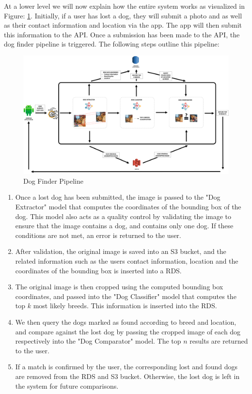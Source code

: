 \documentclass{article}
\begin{document}
At a lower level we will now explain how the entire system works as visualized in Figure: \ref{fig:x app pipeline}.  Initially, if a user has lost a dog, they will submit a photo and as well as their contact information and location via the app.  The app will then submit this information to the API.  Once a submission has been made to the API, the dog finder pipeline is triggered.  The following steps outline this pipeline:

\newpage

\begin{figure}[h]
\centering
	\includegraphics[width=1.0\textwidth]{final-report-images/applowlevel.png}
\caption{Dog Finder Pipeline}
\label{fig:x app pipeline}
\end{figure}

\begin{enumerate}
  
  \item Once a lost dog has been submitted, the image is passed to the "Dog Extractor" model that computes the coordinates of the bounding box of the dog.  This model also acts as a quality control by validating the image to ensure that the image contains a dog, and contains only one dog.  If these conditions are not met, an error is returned to the user.
  
  \item After validation, the original image is saved into an S3 bucket, and the related information such as the users contact information, location and the coordinates of the bounding box is inserted into a RDS.
  
  \item The original image is then cropped using the computed bounding box coordinates, and passed into the "Dog Classifier" model that computes the top $k$ most likely breeds.  This information is inserted into the RDS.
  
  \item We then query the dogs marked as found according to breed and location, and compare against the lost dog by passing the cropped image of each dog respectively into the "Dog Comparator" model.  The top $n$ results are returned to the user.
  
  \item If a match is confirmed by the user, the corresponding lost and found dogs are removed from the RDS and S3 bucket.  Otherwise, the lost dog is left in the system for future comparisons.
  
\end{enumerate}
\end{document}
